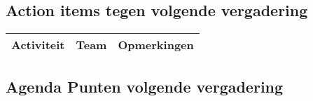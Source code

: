 \subsection{Action items tegen volgende vergadering}
\begin{table} [H]
	\centering
	\begin{tabular} {l|l|l}
		\textbf{Activiteit} & \textbf{Team} & \textbf{Opmerkingen} \\
		\hline
	\end{tabular}
\end{table}

\subsection{Agenda Punten volgende vergadering}


